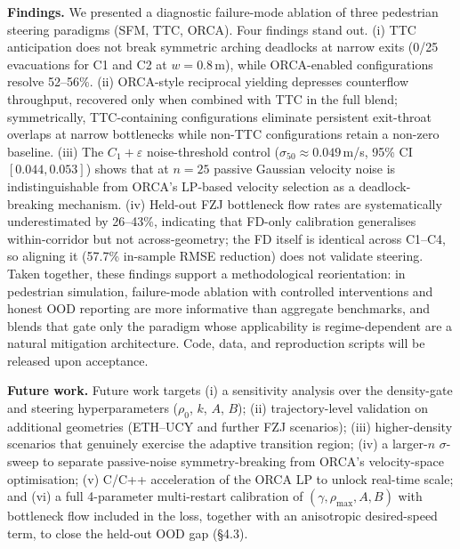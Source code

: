 \documentclass[a4paper,twoside]{article}
\begin{document}
\textbf{Findings.} We presented a diagnostic failure-mode ablation of three pedestrian steering paradigms (SFM, TTC, ORCA). Four findings stand out. (i) TTC anticipation does not break symmetric arching deadlocks at narrow exits (0/25 evacuations for C1 and C2 at $w=0.8$\,m), while ORCA-enabled configurations resolve 52--56\%. (ii) ORCA-style reciprocal yielding depresses counterflow throughput, recovered only when combined with TTC in the full blend; symmetrically, TTC-containing configurations eliminate persistent exit-throat overlaps at narrow bottlenecks while non-TTC configurations retain a non-zero baseline. (iii) The $C_1{+}\varepsilon$ noise-threshold control ($\sigma_{50}\!\approx\!0.049$\,m/s, 95\% CI $[0.044,0.053]$) shows that at $n=25$ passive Gaussian velocity noise is indistinguishable from ORCA's LP-based velocity selection as a deadlock-breaking mechanism. (iv) Held-out FZJ bottleneck flow rates are systematically underestimated by 26--43\%, indicating that FD-only calibration generalises within-corridor but not across-geometry; the FD itself is identical across C1--C4, so aligning it (57.7\% in-sample RMSE reduction) does not validate steering. Taken together, these findings support a methodological reorientation: in pedestrian simulation, failure-mode ablation with controlled interventions and honest OOD reporting are more informative than aggregate benchmarks, and blends that gate only the paradigm whose applicability is regime-dependent are a natural mitigation architecture. Code, data, and reproduction scripts will be released upon acceptance.

\textbf{Future work.} Future work targets (i) a sensitivity analysis over the density-gate and steering hyperparameters ($\rho_0$, $k$, $A$, $B$); (ii) trajectory-level validation on additional geometries (ETH--UCY and further FZJ scenarios); (iii) higher-density scenarios that genuinely exercise the adaptive transition region; (iv) a larger-$n$ $\sigma$-sweep to separate passive-noise symmetry-breaking from ORCA's velocity-space optimisation; (v) C/C++ acceleration of the ORCA LP to unlock real-time scale; and (vi) a full 4-parameter multi-restart calibration of $(\gamma, \rho_{\mathrm{max}}, A, B)$ with bottleneck flow included in the loss, together with an anisotropic desired-speed term, to close the held-out OOD gap (§4.3).



{\small
}
\end{document}
